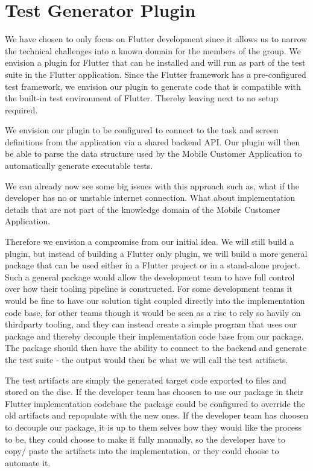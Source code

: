 \section{Test Generator Plugin}
We have chosen to only focus on Flutter development since it allows us to narrow the technical challenges into a known domain for the members of the group.
We envision a plugin for Flutter that can be installed and will run as part of the test suite in the Flutter application.
Since the Flutter framework has a pre-configured test framework, we envision our plugin to generate code that is compatible with the built-in test environment of Flutter.
Thereby leaving next to no setup required.

We envision our plugin to be configured to connect to the task and screen definitions from the application via a shared backend API.
Our plugin will then be able to parse the data structure used by the Mobile Customer Application to automatically generate executable tests.

We can already now see some big issues with this approach such as, what if the developer has no or unstable internet connection.
What about implementation details that are not part of the knowledge domain of the Mobile Customer Application.

Therefore we envision a compromise from our initial idea. 
We will still build a plugin, but instead of building a Flutter only plugin, we will build a more general package that can be used either in a Flutter project or in a stand-alone project.
Such a general package would allow the development team to have full control over how their tooling pipeline is constructed.
For some development teams it would be fine to have our solution tight coupled directly into the implementation code base, for other teams though it would be seen as a risc to rely so havily on thirdparty tooling, and they can instead create a simple program that uses our package and thereby decouple their implementation code base from our package. 
The package should then have the ability to connect to the backend and generate the test suite - the output would then be what we will call the test artifacts.

The test artifacts are simply the generated target code exported to files and stored on the disc. 
If the developer team has choosen to use our package in their Flutter implementation codebase the package could be configured to override the old artifacts and repopulate with the new ones.
If the developer team has choosen to decouple our package, it is up to them selves how they would like the process to be, they could choose to make it fully manually, so the developer have to copy/ paste the artifacts into the implementation, or they could choose to automate it.

